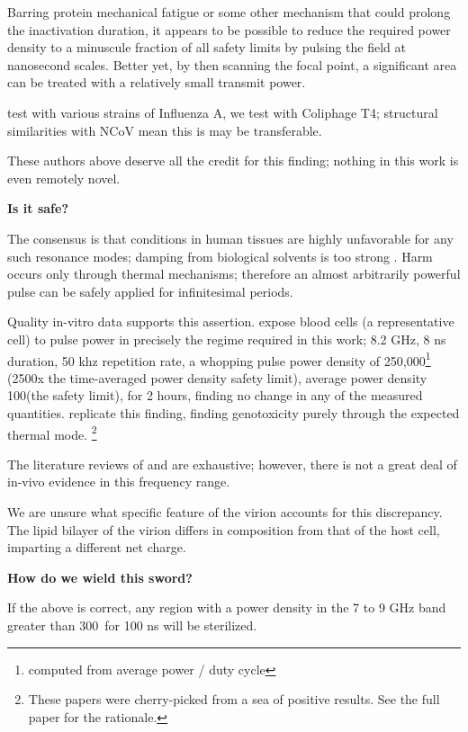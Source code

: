 \documentclass[fleqn,10pt]{paper}
\begin{document}
Barring protein mechanical fatigue \cite{Mechanical2013} or some other mechanism that could prolong the inactivation duration, it appears to be possible to reduce the required power density to a minuscule fraction of all safety limits by pulsing the field at nanosecond scales. Better yet, by then scanning the focal point, a significant area can be treated with a relatively small transmit power.

\cite{Efficient2015} test with various strains of Influenza A, we test with Coliphage T4; structural similarities with NCoV mean this is may be transferable.

These authors above deserve all the credit for this finding; nothing in this work is even remotely novel.

{\Large \textbf{Is it safe?}}

The consensus is that conditions in human tissues are highly unfavorable for any such resonance modes; damping from biological solvents is too strong \cite{Vibrational2002}. Harm occurs only through thermal mechanisms; therefore an almost arbitrarily powerful pulse can be safely applied for infinitesimal periods.

Quality in-vitro data supports this assertion. \cite{Cytogenetic2006} expose blood cells (a representative cell) to pulse power in precisely the regime required in this work; 8.2 GHz, 8 ns duration, 50 khz repetition rate, a whopping pulse power density of 250,000\Wsqm\footnote{computed from average power / duty cycle} (2500x the time-averaged power density safety limit), average power density 100\Wsqm (the safety limit), for 2 hours, finding no change in any of the measured quantities. \cite{DNA2004} replicate this finding, finding genotoxicity purely through the expected thermal mode. \footnote{These papers were cherry-picked from a sea of positive results. See the full paper for the rationale.}

The literature reviews of \cite{ICNIRP2020} and \cite{C95} are exhaustive; however, there is not a great deal of in-vivo evidence in this frequency range\cite{New2019}\cite{Comprehensive2018}.

We are unsure what specific feature of the virion accounts for this discrepancy. The lipid bilayer of the virion differs in composition from that of the host cell, imparting a different net charge.

\clearpage 
{\Large \textbf{How do we wield this sword?}}

If the above is correct, any region with a power density in the 7 to 9 GHz band greater than 300\Wsqm \ for 100 ns will be sterilized.
\end{document}
